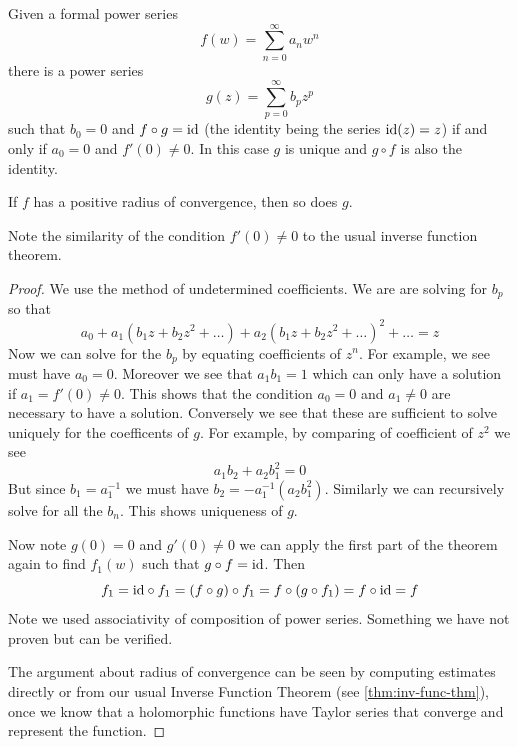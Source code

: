 \begin{theorem}
Given a formal power series
$$f(w) = \sum_{n = 0}^\infty a_n w^n$$
there is a power series 
$$g(z) = \sum_{p = 0}^\infty b_p z^p$$
such that $b_0 = 0$ and $f \circ g = \text{id}$ (the identity being the series $\text{id}(z) = z$) if and only if $a_0 = 0$ and $f'(0) \neq 0$. In this case $g$ is unique and $g \circ f$ is also the identity. 

If $f$ has a positive radius of convergence, then so does $g$.
\end{theorem}
\begin{remark}
Note the similarity of the condition $f'(0) \neq 0$ to the usual inverse function theorem.
\end{remark}
\begin{proof}
We use the method of undetermined coefficients. We are are solving for $b_p$ so that
$$ a_0 + a_1(b_1z + b_2 z^2 + \dots) + a_2(b_1z + b_2 z^2 + \dots)^2 + \dots = z $$
Now we can solve for the $b_p$ by equating coefficients of $z^n$. For example, we see must have $a_0 = 0$. Moreover we see that $a_1 b_1 = 1$ which can only have a solution if $a_1 = f'(0) \neq 0 $. This shows that the condition $a_0 = 0$ and $a_1 \neq 0$ are necessary to have a solution. Conversely we see that these are sufficient to solve uniquely for the coefficents of $g$. For example, by comparing of coefficient of $z^2$ we see
$$ a_1b_2 + a_2b_1^2 = 0 $$
But since $b_1 = a_1^{-1}$ we must have $b_2 = -a_1^{-1}(a_2 b_1^2)$. Similarly we can recursively solve for all the $b_n$. This shows uniqueness of $g$.

Now note $g(0) = 0$ and $g'(0) \neq 0$ we can apply the first part of the theorem again to find $f_1(w)$ such that $g \circ f = \text{id}$. Then
$$ f_1 = \text{id} \circ f_1 = (f \circ g) \circ f_1 = f \circ (g \circ f_1) = f \circ \text{id} = f $$
Note we used associativity of composition of power series. Something we have not proven but can be verified.

The argument about radius of convergence can be seen by computing estimates directly or from our usual Inverse Function Theorem (see \autoref{thm:inv-func-thm}), once we know that a holomorphic functions have Taylor series that converge and represent the function.
\end{proof}

